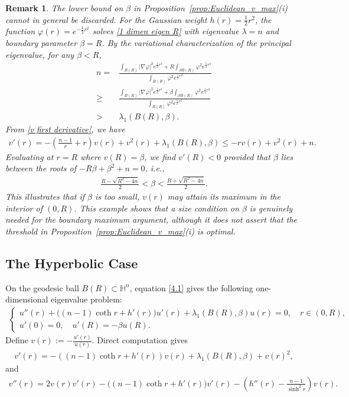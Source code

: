 \documentclass[11pt,leqno]{amsart}
\newtheorem{remark}[theorem]{Remark}
\numberwithin{equation}{section}
\begin{document}
\begin{remark}
	The lower bound on \(\beta\) in
	Proposition~\ref{prop:Euclidean_v_max}\textup{(i)} cannot in general be
	discarded. 
For the Gaussian weight $h(r) = \frac{1}{2}r^2$, the function $\varphi(r)=e^{-\frac{1}{2}r^{2}}$ solves  \eqref{1 dimen eigen R} with eigenvalue $\lambda=n$ and boundary parameter $\beta=R$. By the variational characterization of the principal eigenvalue, for any $\beta < R$,
\begin{align*}
n =& \frac{\int_{B(R)}|\nabla \varphi|^{2}e^{\frac{1}{2}r^{2}} + R\int_{\partial B(R)}\varphi^{2}e^{\frac{1}{2}r^{2}}}{\int_{B(R)}\varphi^{2}e^{\frac{1}{2}r^{2}}} \\
\geq& \frac{\int_{B(R)}|\nabla \varphi|^{2}e^{\frac{1}{2}r^{2}} + \beta\int_{\partial B(R)}\varphi^{2}e^{\frac{1}{2}r^{2}}}{\int_{B(R)}\varphi^{2}e^{\frac{1}{2}r^{2}}} \\
>& \lambda_1(B(R),\beta).
\end{align*}
From  \eqref{v first derivative}, we have
\begin{align*}
v'(r) = -\left(\frac{n-1}{r}+r\right)v(r)+v^2(r)+\lambda_1(B(R),\beta) \leq -rv(r)+v^2(r)+n.
\end{align*}
Evaluating at $r=R$ where $v(R)=\beta$, we find $v'(R) < 0$ provided that $\beta$ lies between the roots of $-R\beta + \beta^2 + n = 0$, i.e.,
\begin{align*}
\frac{R-\sqrt{R^{2}-4n}}{2} < \beta < \frac{R+\sqrt{R^{2}-4n}}{2}.
\end{align*}
This illustrates that if $\beta$ is too small, $v(r)$ may attain its maximum in the interior of $(0,R)$. This example shows that a
size condition on \(\beta\) is genuinely needed for the boundary
maximum argument, although it does not assert that the threshold in
Proposition~\ref{prop:Euclidean_v_max}\textup{(i)} is optimal.
\end{remark}

\subsection{The Hyperbolic Case}
On the geodesic ball $B(R)\subset \mathbb{H}^{n}$,  equation \eqref{4.1} gives the following one-dimensional eigenvalue problem:
\begin{align}\label{1 dimen eigen}
    \begin{cases}
   u''(r)+\big((n-1)\coth{r}+h'(r)\big)u'(r)+\lambda_1(B(R), \beta) u(r)=0, \quad r\in (0, R),\\
   u'(0)=0,\quad u'(R)=-\beta u(R).
\end{cases}
\end{align}
Define $v(r):=-\frac{u'(r)}{u(r)}$. Direct computation gives
\begin{align}
    v'(r) = -\left((n-1)\coth{r}+h'(r)\right)v(r) + \lambda_1(B(R), \beta) + v(r)^2,
\end{align}
and 
\begin{align}\label{v second diff equation}
    v''(r) = 2v(r)v'(r) - \big((n-1)\coth{r}+h'(r)\big)v'(r) - \left(h''(r)-\frac{n-1}{\sinh^{2}{r}}\right)v(r).
\end{align}
\end{document}
